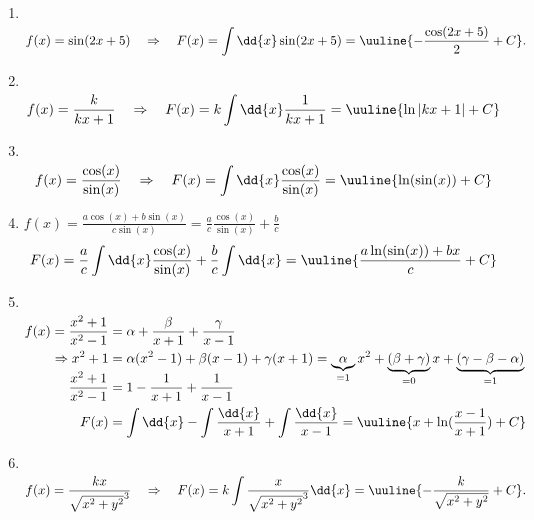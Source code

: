 \begin{enumerate}[label=(\alph*)]
    \setlength{\mathindent}{0pt}
    \item$~$\\[-1.5cm] 
    \begin{align}
        f(x)=\sin(2x+5) \quad \Rightarrow \quad F(x) = \int \dd{x} \sin(2x+5) = \uuline{-\frac{\cos(2x+5)}{2}+C}.
    \end{align}
    \item$~$\\[-1.5cm]
    \begin{align}
        f(x)=\frac{k}{kx+1} \quad \Rightarrow \quad F(x) = k \int \dd{x} \frac{1}{kx+1} = \uuline{\ln|kx+1| + C}
    \end{align}
    \item$~$\\[-1.5cm] 
    \begin{align}
        f(x)=\frac{\cos(x)}{\sin(x)} \quad \Rightarrow \quad F(x) = \int \dd{x} \frac{\cos(x)}{\sin(x)} = \uuline{\ln(\sin(x))+C}
    \end{align}
    \item $f(x)=\frac{a\cos(x)+b\sin(x)}{c\sin(x)} = \frac{a}{c}\frac{\cos(x)}{\sin(x)} + \frac{b}{c}$
    \begin{align}
        F(x) = \frac{a}{c} \int\dd{x} \frac{\cos(x)}{\sin(x)} + \frac{b}{c} \int \dd{x} = \uuline{\frac{a \ln(\sin(x))+bx}{c}+ C}  
    \end{align}
    \item$~$\\[-1.5cm] 
    \begin{align}
        f(x)=\frac{x^2+1}{x^2-1} &= \alpha + \frac{\beta}{x+1} + \frac{\gamma}{x-1}  \\
        \Rightarrow x^2 + 1 &= \alpha (x^2-1) + \beta (x-1) + \gamma (x+1) = \underbrace{\alpha}_{=1} x^2 + \underbrace{(\beta+\gamma)}_{=0} x + \underbrace{(\gamma - \beta -\alpha)}_{=1} \\[-5mm]
        \frac{x^2+1}{x^2-1} &= 1 - \frac{1}{x+1} + \frac{1}{x-1} \\
        F(x) &= \int\dd{x} - \int\frac{\dd{x}}{x+1} + \int \frac{\dd{x}}{x-1} = \uuline{x + \ln(\frac{x-1}{x+1})+C} 
    \end{align}
    \item$~$\\[-1.5cm]  
    \begin{align}
        f(x)=\frac{kx}{\sqrt{x^2+y^2}^3} \quad \Rightarrow \quad F(x) = k \int \frac{x}{\sqrt{x^2+y^2}^3} \dd{x} = \uuline{- \frac{k}{\sqrt{x^2+y^2}} + C}.
    \end{align}
\end{enumerate}
%
